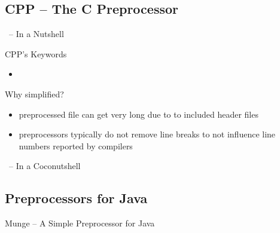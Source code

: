 \subsection{CPP -- The C Preprocessor}
\begin{frame}{\myframetitle\ -- In a Nutshell}
	\begin{mycolumns}[T,columns=3,animation=none]
		\begin{definition}{CPP's Keywords}
			\begin{itemize}
				\item 
			\end{itemize}
		\end{definition}
	\mynextcolumn
		\pause
	\mynextcolumn
		\pause
		\pause
		\begin{note}{Why simplified?}
			\begin{itemize}
				\item preprocessed file can get very long due to to included header files
				\item preprocessors typically do not remove line breaks to not influence line numbers reported by compilers
			\end{itemize}
		\end{note}
	\end{mycolumns}
\end{frame}

\begin{frame}{\myframetitle\ -- In a Coconutshell}
	\todots
\end{frame}



\subsection{Preprocessors for Java}
\begin{frame}{Munge -- A Simple Preprocessor for Java \mytitlesource{\featureide}}
	\begin{mycolumns}[widths={55}]
	\mynextcolumn
	\end{mycolumns}
\end{frame}


